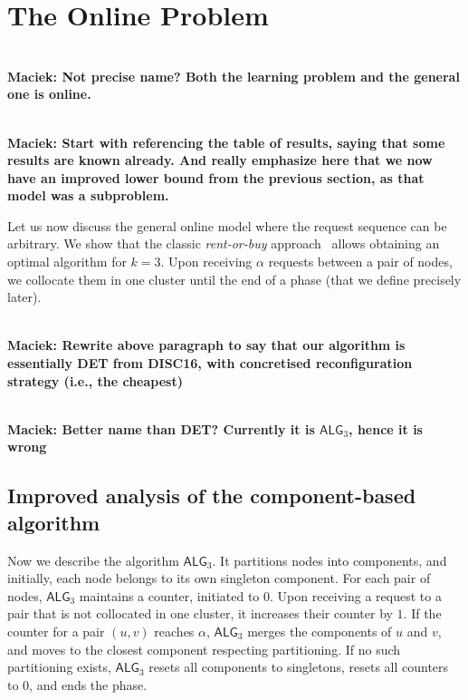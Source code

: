 \documentclass[manuscript,screen=true, review, anonymous]{acmart}
\newcommand{\OPT}{\textsf{OPT}\xspace}
\newcommand{\OBRP}{BRP}
\newcommand{\TAlg}{{\ensuremath{\textsf{ALG}_{3}}}\xspace}
\newcommand\maciek[1]{\color{brown}\textbf{\\ Maciek: #1}\color{black}}
\begin{document}
 
\section{The Online Problem}
\label{sec:k3}


\maciek{Not precise name? Both the learning problem and the general one is online.}

\maciek{Start with referencing the table of results, saying that some results are known already. And really emphasize here that we now have an improved lower bound from the previous section, as that model was a subproblem.}

Let us now discuss the general online
model where the request sequence
can be arbitrary. We show that the classic \emph{rent-or-buy} approach~\cite{karlin-ski-rental} allows obtaining an optimal algorithm for $k=3$.
Upon receiving $\alpha$ requests between a pair of nodes, we collocate them in one cluster until the end of a phase (that we define precisely later).

\maciek{Rewrite above paragraph to say that our algorithm is essentially DET from DISC16, with concretised reconfiguration strategy (i.e., the cheapest)}

\maciek{Better name than DET? Currently it is \TAlg, hence it is wrong}

\subsection{Improved analysis of the component-based algorithm}


Now we describe the algorithm \TAlg.
It partitions nodes into components, and
initially, each node belongs to its own singleton component.
For each pair of nodes, \TAlg maintains a counter, initiated to $0$. 
Upon receiving a request to a pair that is not collocated in one cluster, it increases their counter by $1$.
If the counter for a pair $(u,v)$ reaches $\alpha$, \TAlg merges the components of $u$ and $v$, and moves to the closest component respecting partitioning.
If no such partitioning exists, \TAlg resets all components to singletons, resets all counters to $0$, and ends the phase.
\end{document}
